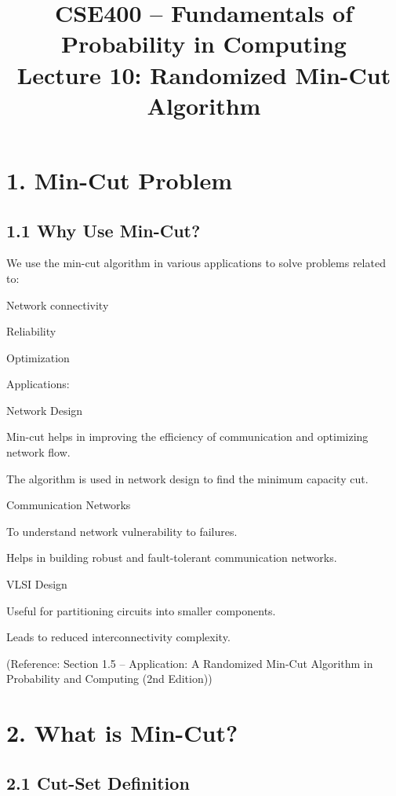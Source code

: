 \documentclass[12pt]{article}
\begin{document}
\title{CSE400 – Fundamentals of Probability in Computing\\
Lecture 10: Randomized Min-Cut Algorithm}
\date{}
\maketitle

\section*{1. Min-Cut Problem}

\subsection*{1.1 Why Use Min-Cut?}

We use the min-cut algorithm in various applications to solve problems related to:

Network connectivity

Reliability

Optimization

Applications:

Network Design

Min-cut helps in improving the efficiency of communication and optimizing network flow.

The algorithm is used in network design to find the minimum capacity cut.

Communication Networks

To understand network vulnerability to failures.

Helps in building robust and fault-tolerant communication networks.

VLSI Design

Useful for partitioning circuits into smaller components.

Leads to reduced interconnectivity complexity.

(Reference: Section 1.5 – Application: A Randomized Min-Cut Algorithm in Probability and Computing (2nd Edition))

\section*{2. What is Min-Cut?}

\subsection*{2.1 Cut-Set Definition}
\end{document}
